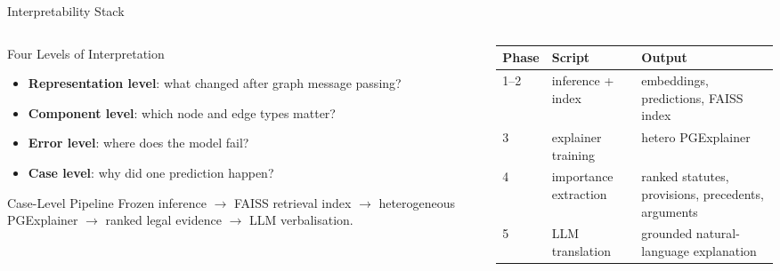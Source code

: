 \documentclass[aspectratio=169,11pt]{beamer}
\newenvironment{tightitemize}{
  \begin{itemize}
    \setlength{\itemsep}{2pt}
    \setlength{\parskip}{0pt}
}{\end{itemize}}
\newcommand{\highlight}[1]{\textcolor{ThesisBlue}{\textbf{#1}}}
\begin{document}
\begin{frame}{Interpretability Stack}
  \scriptsize
  \begin{columns}[T]
    \begin{column}{0.52\textwidth}
      \begin{block}{Four Levels of Interpretation}
        \begin{tightitemize}
          \item \highlight{Representation level}: what changed after graph message passing?
          \item \highlight{Component level}: which node and edge types matter?
          \item \highlight{Error level}: where does the model fail?
          \item \highlight{Case level}: why did one prediction happen?
        \end{tightitemize}
      \end{block}
      \begin{block}{Case-Level Pipeline}
        Frozen inference $\rightarrow$ FAISS retrieval index $\rightarrow$ heterogeneous PGExplainer $\rightarrow$ ranked legal evidence $\rightarrow$ LLM verbalisation.
      \end{block}
    \end{column}
    \begin{column}{0.44\textwidth}
      \scriptsize
      \begin{adjustbox}{max width=\linewidth}
        \begin{tabular}{p{1.5cm}p{2.7cm}p{3.6cm}}
          \toprule
          \textbf{Phase} & \textbf{Script} & \textbf{Output} \\
          \midrule
          1--2 & inference + index & embeddings, predictions, FAISS index \\
          3 & explainer training & hetero PGExplainer \\
          4 & importance extraction & ranked statutes, provisions, precedents, arguments \\
          5 & LLM translation & grounded natural-language explanation \\
          \bottomrule
        \end{tabular}
      \end{adjustbox}
    \end{column}
  \end{columns}
\end{frame}
\end{document}
